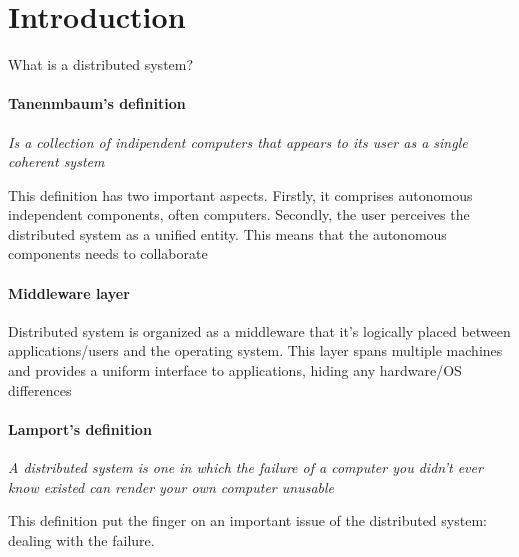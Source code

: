 \section{Introduction}
What is a distributed system?
\paragraph{Tanenmbaum's definition}
\textit{Is a collection of indipendent computers that appears to its user as a single
coherent system}

This definition has two important aspects. Firstly, it comprises autonomous independent components, often computers. Secondly, the user perceives the distributed system as a unified entity. This means that the autonomous components needs to collaborate

\paragraph{Middleware layer}
Distributed system is organized as a middleware
that it’s logically placed between applications/users and the operating system. This layer spans multiple machines and provides a uniform interface to applications, hiding any hardware/OS differences

\paragraph{Lamport's definition}
\textit{A distributed system is one in which the failure of a computer you didn’t ever
know existed can render your own computer unusable}

This definition put the finger on an important issue of the distributed system: dealing with the failure.

